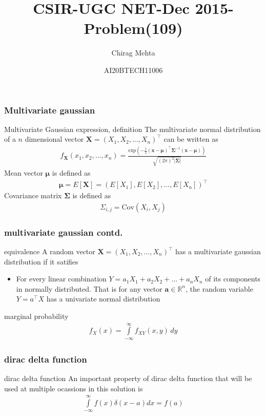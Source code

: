 \documentclass{beamer}
\title{CSIR-UGC NET-Dec 2015-Problem(109)}
\author{Chirag Mehta}
\date{AI20BTECH11006}
\providecommand{\sbrak}[1]{\ensuremath{{}\left[#1\right]}}
\providecommand{\brak}[1]{\ensuremath{\left(#1\right)}}
\providecommand{\abs}[1]{\vert#1\vert}
\begin{document}
\begin{frame}
\titlepage
\end{frame}
\begin{frame}
\frametitle{Multivariate gaussian}
\begin{block}{Multivariate Gaussian expression, definition}
The multivariate normal distribution of a $n$ dimensional vector $\boldsymbol{X}=\brak{X_1,X_2,...,X_n}^\top$ can be written as
\begin{align}
f_{\boldsymbol{X}}(x_1,x_2,...,x_n)=\frac{\text{exp}\brak{-\frac{1}{2}\brak{\boldsymbol{x-\mu}}^\top\boldsymbol{\Sigma}^{-1}\brak{\boldsymbol{x-\mu}}}}{\sqrt{(2\pi)^2\abs{\boldsymbol{\Sigma}}}}
\end{align}
Mean vector $\boldsymbol{\mu}$ is defined as
\begin{align}
\boldsymbol{\mu}=E\sbrak{\boldsymbol{X}}=\brak{E\sbrak{X_1},E\sbrak{X_2},...,E\sbrak{X_n}}^\top
\end{align}
Covariance matrix $\boldsymbol{\Sigma}$ is defined as
\begin{align}
\Sigma_{i,j}=\text{Cov}\brak{X_i,X_j}
\end{align}

\end{block}
\end{frame}


\begin{frame}
\frametitle{multivariate gaussian contd.}
\begin{block}{equivalence}
A random vector $\boldsymbol{X}=\brak{X_1,X_2,...,X_n}^\top$ has a multivariate gaussian distribution if it satifies\\
\begin{itemize}
\item For every linear combination $Y=a_1X_1+a_2X_2+...+a_nX_n$ of its components in normally distributed. That is for any vector $\boldsymbol{a}\in\mathbb{R}^n$, the random variable $Y=a^\top X$ has a univariate normal distribution
\end{itemize}
\end{block}
\begin{block}{marginal probability}
\begin{align}
f_X(x)=\int\limits_{-\infty}^{\infty}f_{XY}(x,y)\,dy
\end{align}
\end{block}
\end{frame}


\begin{frame}
\frametitle{dirac delta function}
\begin{block}{dirac delta function}
An important property of dirac delta function that will be used at multiple ocassions in this solution is
\begin{align}
\displaystyle\int\limits_{-\infty}^{\infty} f(x)\delta(x-a)dx=f(a) \label{eq:dirac}
\end{align}
\end{block}
\end{frame}
\end{document}
